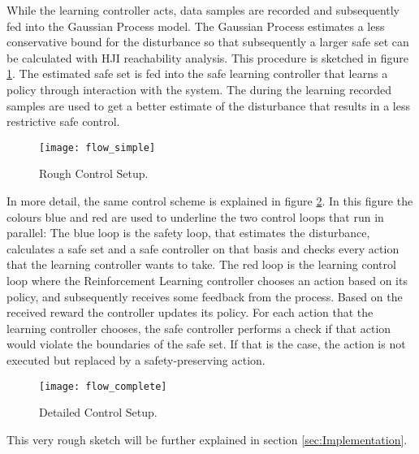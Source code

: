 \documentclass[../main.tex]{subfiles}
\begin{document}
While the learning controller acts, data samples are recorded and subsequently fed into the Gaussian Process model. The Gaussian Process estimates a less conservative bound for the disturbance so that subsequently a larger safe set can be calculated with HJI reachability analysis. This procedure is sketched in figure \ref{fig:flow_simple}. The estimated safe set is fed into the safe learning controller that learns a policy through interaction with the system. The during the learning recorded samples are used to get a better estimate of the disturbance that results in a less restrictive safe control.\par
\begin{figure}
    \centering
    \texttt{[image: flow\_simple]}
    \caption{Rough Control Setup.}
    \label{fig:flow_simple}
\end{figure}
In more detail, the same control scheme is explained in figure \ref{fig:flow_complete}. In this figure the colours blue and red are used to underline the two control loops that run in parallel: The blue loop is the safety loop, that estimates the disturbance, calculates a safe set and a safe controller on that basis and checks every action that the learning controller wants to take. The red loop is the learning control loop where the Reinforcement Learning controller chooses an action based on its policy, and subsequently receives some feedback from the process. Based on the received reward the controller updates its policy. For each action that the learning controller chooses, the safe controller performs a check if that action would violate the boundaries of the safe set. If that is the case, the action is not executed but replaced by a safety-preserving action.
\begin{figure}
    \centering
    \texttt{[image: flow\_complete]}
    \caption{Detailed Control Setup.}
    \label{fig:flow_complete}
\end{figure}
This very rough sketch will be further explained in section \ref{sec:Implementation}.
\end{document}
